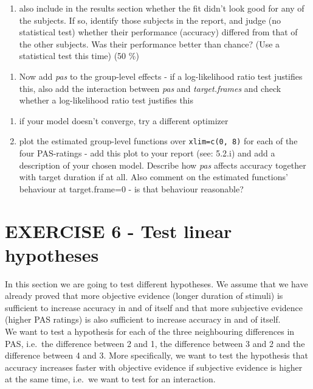 \documentclass[
]{article}
\providecommand{\tightlist}{%
  \setlength{\itemsep}{0pt}\setlength{\parskip}{0pt}}
\begin{document}
\begin{enumerate}
\def\labelenumi{\roman{enumi}.}
\setcounter{enumi}{1}
\tightlist
\item
  also include in the results section whether the fit didn't look good
  for any of the subjects. If so, identify those subjects in the report,
  and judge (no statistical test) whether their performance (accuracy)
  differed from that of the other subjects. Was their performance better
  than chance? (Use a statistical test this time) (50 \%)
\end{enumerate}

\begin{enumerate}
\def\labelenumi{\arabic{enumi})}
\setcounter{enumi}{2}
\tightlist
\item
  Now add \emph{pas} to the group-level effects - if a log-likelihood
  ratio test justifies this, also add the interaction between \emph{pas}
  and \emph{target.frames} and check whether a log-likelihood ratio test
  justifies this
\end{enumerate}

\begin{enumerate}
\def\labelenumi{\roman{enumi}.}
\item
  if your model doesn't converge, try a different optimizer
\item
  plot the estimated group-level functions over \texttt{xlim=c(0,\ 8)}
  for each of the four PAS-ratings - add this plot to your report (see:
  5.2.i) and add a description of your chosen model. Describe how
  \emph{pas} affects accuracy together with target duration if at all.
  Also comment on the estimated functions' behaviour at target.frame=0 -
  is that behaviour reasonable?
\end{enumerate}

\hypertarget{exercise-6---test-linear-hypotheses}{%
\section{EXERCISE 6 - Test linear
hypotheses}\label{exercise-6---test-linear-hypotheses}}

In this section we are going to test different hypotheses. We assume
that we have already proved that more objective evidence (longer
duration of stimuli) is sufficient to increase accuracy in and of itself
and that more subjective evidence (higher PAS ratings) is also
sufficient to increase accuracy in and of itself.\\
We want to test a hypothesis for each of the three neighbouring
differences in PAS, i.e.~the difference between 2 and 1, the difference
between 3 and 2 and the difference between 4 and 3. More specifically,
we want to test the hypothesis that accuracy increases faster with
objective evidence if subjective evidence is higher at the same time,
i.e.~we want to test for an interaction.
\end{document}
